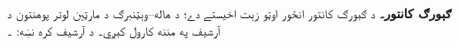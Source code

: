 \textbf{ګېورګ کانتور۔} د ګېورګ کانتور انځور اوټو زېت اخيستے دے؛ د هاله--وېټنبرګ د مارټين لوتر پوهنتون د آرشيف په مننه کارول کېږي۔ د آرشيف کره نښه: ۔
